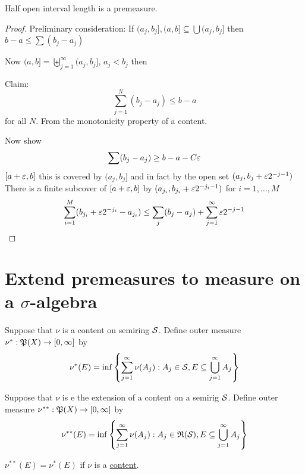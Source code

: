 \begin{claim}
  Half open interval length is a premeasure.
\end{claim}
\begin{proof}
  
Preliminary consideration: If $(a_j, b_j], (a, b] \subseteq \bigcup(a_j, b_j]$ then
$b-a \le \sum (b_j - a_j)$

Now $(a, b] = \biguplus_{j=1}^\infty (a_j, b_j]$, $a_j < b_j$ then 

Claim:
\[\sum_{j=1}^N (b_j - a_j) \le b-a\]
for all $N$. From the monotonicity property of a content.

Now show 
\[\sum (b_j - a_j) \ge b-a-C\varepsilon\]
$[a+\varepsilon, b]$ this is covered by $(a_j, b_j]$
and in fact by the open set $(a_j, b_j + \varepsilon 2^{-j-1})$
There is a finite subcover of $[a + \varepsilon, b]$ by $(a_{j_i}, b_{j_i} + \varepsilon 2^{-j_i-1})$ for $i = 1, \dotsc, M$
$$\sum_{i=1}^M (b_{j_i} + \varepsilon 2^{-j_i} - a_{j_i}) \le \sum_{j} (b_j - a_j) + \sum_{j=1}^\infty \varepsilon2^{-j-1}$$

\end{proof}

\section{Extend premeasures to measure on a $\sigma$-algebra}

\begin{definition}
  Suppose that $\nu$ is a content on semiring $\mathcal S$. Define outer measure $\nu^*: \mathfrak P(X) \to [0, \infty]$ by
  \[\nu^*(E) = \inf\left\{\sum_{j=1}^\infty \nu(A_j) : A_j \in \mathcal S, E \subseteq \bigcup_{j=1}^\infty A_j\right\}\]
\end{definition}

\begin{definition}
  Suppose that $\nu$ is e the extension of a content on a semirig $\mathcal S$.
  Define outer measure $\nu^{**}: \mathfrak P(X) \to [0, \infty]$ by
  \[\nu^{**}(E) = \inf\left\{\sum_{j=1}^\infty \nu(A_j) : A_j \in \mathfrak R(\mathcal S), E \subseteq \bigcup_{j=1}^\infty A_j\right\}\]
\end{definition}



\begin{lemma}
  $\nu^{**}(E) = \nu^{*}(E)$
  if $\nu$ is a \underline{content}.
\end{lemma}

